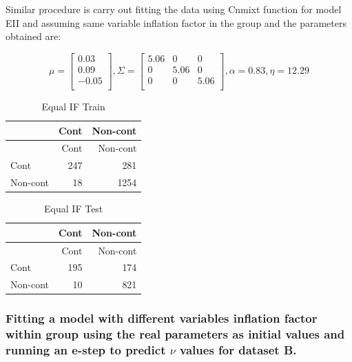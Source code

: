 \documentclass[
]{article}
\begin{document}
Similar procedure is carry out fitting the data using Cnmixt function
for model EII and assuming same variable inflation factor in the group
and the parameters obtained are:

\[
\mu = \begin{bmatrix}0.03 \\0.09 \\-0.05 \\\end{bmatrix} , \Sigma = \begin{bmatrix}5.06&0&0 \\0&5.06&0 \\0&0&5.06 \\\end{bmatrix}, \alpha = 0.83 , \eta = 12.29
\]

\begin{longtable}[]{@{}lrr@{}}
\caption{Equal IF Train}\tabularnewline
\toprule\noalign{}
& Cont & Non-cont \\
\midrule\noalign{}
\endfirsthead
\toprule\noalign{}
& Cont & Non-cont \\
\midrule\noalign{}
\endhead
\bottomrule\noalign{}
\endlastfoot
Cont & 247 & 281 \\
Non-cont & 18 & 1254 \\
\end{longtable}

\begin{longtable}[]{@{}lrr@{}}
\caption{Equal IF Test}\tabularnewline
\toprule\noalign{}
& Cont & Non-cont \\
\midrule\noalign{}
\endfirsthead
\toprule\noalign{}
& Cont & Non-cont \\
\midrule\noalign{}
\endhead
\bottomrule\noalign{}
\endlastfoot
Cont & 195 & 174 \\
Non-cont & 10 & 821 \\
\end{longtable}

\hypertarget{fitting-a-model-with-different-variables-inflation-factor-within-group-using-the-real-parameters-as-initial-values-and-running-an-e-step-to-predict-nu-values-for-dataset-b.}{%
\subsubsection{\texorpdfstring{Fitting a model with different variables
inflation factor within group using the real parameters as initial
values and running an e-step to predict \(\nu\) values for dataset
B.}{Fitting a model with different variables inflation factor within group using the real parameters as initial values and running an e-step to predict \textbackslash nu values for dataset B.}}\label{fitting-a-model-with-different-variables-inflation-factor-within-group-using-the-real-parameters-as-initial-values-and-running-an-e-step-to-predict-nu-values-for-dataset-b.}}
\end{document}

